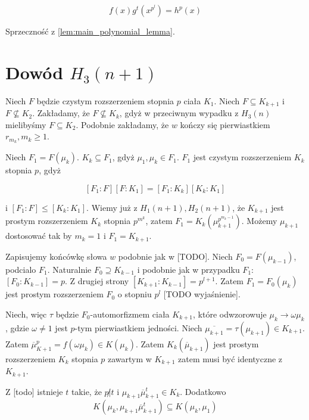 \[f(x)g^t \left( x^{p^l} \right) = h^p(x)\]

Sprzeczność z \ref{lem:main_polynomial_lemma}.


\section{Dowód $H_3(n+1)$}
Niech $F$ będzie czystym rozszerzeniem stopnia $p$ ciała $K_1$. Niech $F
\subseteq K_{k+1}$ i $F \not \subseteq K_2$. Zakładamy, że $F \not \subseteq
K_k$, gdyż w przeciwnym wypadku z $H_3(n)$ mielibyśmy $F \subseteq K_2$.
Podobnie zakładamy, że $w$ kończy się pierwiastkiem $r_{m_k}, m_k \geq 1$.

Niech $F_1 = F \left( \mu_k \right)$. $K_k \subseteq F_1$, gdyż $\mu_1, \mu_k
\in F_1$. $F_1$ jest czystym rozszerzeniem $K_k$ stopnia $p$, gdyż 

\[
\left[F_1:F\right]\left[F:K_1 \right] =
\left[F_1:K_k\right]\left[K_k:K_1\right]
\]

i $\left[F_1:F\right] \leq \left[K_k:K_1\right]$. Wiemy już z $H_1(n+1),
H_2(n+1)$, że $K_{k+1}$ jest prostym rozszerzeniem $K_k$ stopnia $p^{m^k}$,
zatem $F_1 = K_k \left(\mu_{k+1}^{p^{m_k -1}} \right)$. Możemy $\mu_{k+1}$
dostosować tak by $m_k = 1$ i $F_1 = K_{k+1}$.

Zapisujemy końcówkę słowa $w$ podobnie jak w [TODO]. Niech $F_0 = F \left(
\mu_{k-1} \right)$, podcialo $F_1$. Naturalnie $F_0 \supseteq K_{k-1}$ i
podobnie jak w przypadku $F_1$: $\left[F_0:K_{k-1} \right] = p$. Z drugiej
strony $\left[ K_{k+1} : K_{k-1} \right] = p^{l+1}$. 
Zatem $F_1 = F_0 \left(\mu_k \right)$ jest prostym rozszerzeniem $F_0$ o stopniu
$p^l$ [TODO wyjaśnienie].

Niech, więc $\tau$ będzie $F_0$-automorfizmem ciała $K_{k+1}$, które odwzorowuje
$\mu_k \rightarrow \omega \mu_k$, gdzie $\omega \neq 1$ jest $p$-tym
pierwiastkiem jedności. Niech $\overline{\mu_{k+1}} = \tau \left( \mu_{k+1}
\right) \in K_{k+1}$. Zatem $\overline{\mu}_{K+1}^p = f \left( \omega \mu_k
\right) \in K \left( \mu_k \right)$.
Zatem $K_k \left(\overline{\mu}_{k+1} \right)$ jest prostym rozszerzeniem $K_k$
stopnia $p$ zawartym w $K_{k+1}$ zatem musi być identyczne z $K_{k+1}$.

Z [todo] istnieje $t$ takie, że $p \not | t$ i 
$\mu_{k+1} \overline{\mu}_{k+1}^t \in K_k$. Dodatkowo
\[ K \left( \mu_k, \mu_{k+1} \overline{\mu}_{k+1}^t \right)
  \subseteq
  K \left( \mu_k, \mu_1 \right) 
\]

